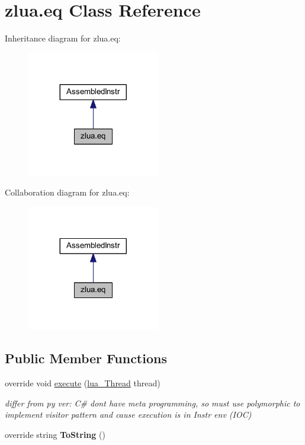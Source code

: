 \hypertarget{classzlua_1_1eq}{}\section{zlua.\+eq Class Reference}
\label{classzlua_1_1eq}


Inheritance diagram for zlua.\+eq\+:
\nopagebreak
\begin{figure}[H]
\begin{center}
\leavevmode
\includegraphics[width=164pt]{classzlua_1_1eq__inherit__graph}
\end{center}
\end{figure}


Collaboration diagram for zlua.\+eq\+:
\nopagebreak
\begin{figure}[H]
\begin{center}
\leavevmode
\includegraphics[width=164pt]{classzlua_1_1eq__coll__graph}
\end{center}
\end{figure}
\subsection*{Public Member Functions}
\begin{DoxyCompactItemize}
\item 
override void \mbox{\hyperlink{classzlua_1_1eq_a802b2377436b97b137b50c36b2867d29}{execute}} (\mbox{\hyperlink{classzlua_1_1lua___thread}{lua\+\_\+\+Thread}} thread)
\begin{DoxyCompactList}\small\item\em differ from py ver\+: C\# dont have meta programming, so must use polymorphic to implement visitor pattern and cause execution is in Instr env (I\+OC) \end{DoxyCompactList}\item 
\mbox{\label{classzlua_1_1eq_a556330ea93d3dc16291681a1ece7d3a7}} 
override string {\bfseries To\+String} ()
\end{DoxyCompactItemize}
